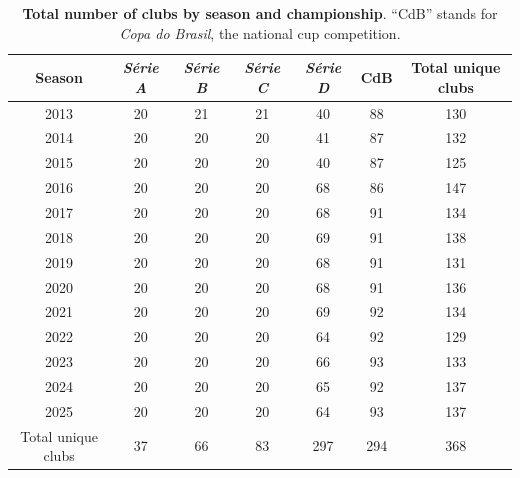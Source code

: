 \begin{table}[htbp]
    \centering
    \begin{tabular}{ccccccc}
        \toprule
        Season             & \textit{Série A} & \textit{Série B} & \textit{Série C} & \textit{Série D} & CdB & Total unique clubs \\
        \midrule
        2013               & 20      & 21      & 21      & 40      & 88  & 130                \\
        2014               & 20      & 20      & 20      & 41      & 87  & 132                \\
        2015               & 20      & 20      & 20      & 40      & 87  & 125                \\
        2016               & 20      & 20      & 20      & 68      & 86  & 147                \\
        2017               & 20      & 20      & 20      & 68      & 91  & 134                \\
        2018               & 20      & 20      & 20      & 69      & 91  & 138                \\
        2019               & 20      & 20      & 20      & 68      & 91  & 131                \\
        2020               & 20      & 20      & 20      & 68      & 91  & 136                \\
        2021               & 20      & 20      & 20      & 69      & 92  & 134                \\
        2022               & 20      & 20      & 20      & 64      & 92  & 129                \\
        2023               & 20      & 20      & 20      & 66      & 93  & 133                \\
        2024               & 20      & 20      & 20      & 65      & 92  & 137                \\
        2025               & 20      & 20      & 20      & 64      & 93  & 137                \\
        \midrule
        Total unique clubs & 37      & 66      & 83      & 297     & 294 & 368                \\
        \bottomrule
    \end{tabular}
    \caption{
        \textbf{Total number of clubs by season and championship}.
        ``CdB'' stands for \textit{Copa do Brasil}, the national cup competition.
    }
    \label{tab:total_clubs}
\end{table}

